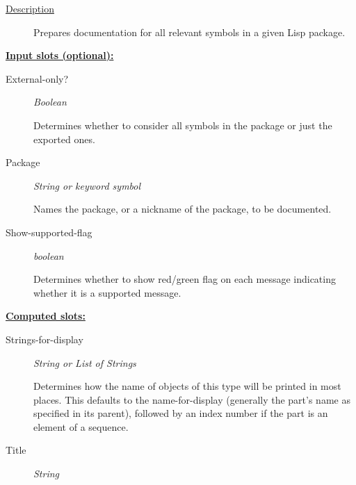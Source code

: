 \documentclass [11pt]{book}
\begin{document}
\begin{itemize}
\begin{description}
\item [
\underline{Description}]


Prepares documentation for all relevant symbols in a given Lisp package.



\end{description}








\textbf{
\underline{Input slots (optional):}}

\begin{description}

\item [External-only?]
\emph{Boolean}

 Determines whether to consider all symbols in the package or just the exported ones.




\item [Package]
\emph{String or keyword symbol}

 Names the package, or a nickname of the package, to be documented.




\item [Show-supported-flag]
\emph{boolean}

 Determines whether to show red/green flag on each message indicating whether it is a
supported message.




\end{description}






\textbf{
\underline{Computed slots:}}

\begin{description}

\item [Strings-for-display]
\emph{String or List of Strings}

 Determines how the name of objects of
this type will be printed in most places.  This defaults to the
name-for-display (generally the part's name as specified in its
parent), followed by an index number if the part is an element of a
sequence.




\item [Title]
\emph{String}


\end{description}
\end{itemize}
\end{document}

